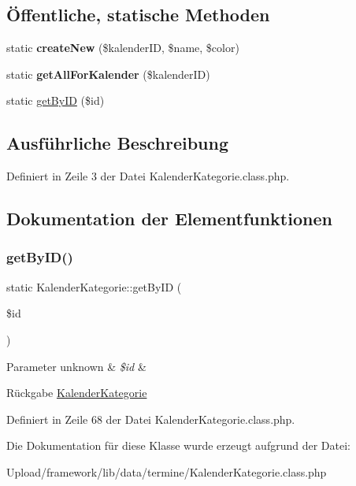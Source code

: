\subsection*{Öffentliche, statische Methoden}
\begin{DoxyCompactItemize}
\item 
\mbox{\label{class_kalender_kategorie_a96a63f62d1862924ce91e958fed52f47}} 
static {\bfseries create\+New} (\$kalender\+ID, \$name, \$color)
\item 
\mbox{\label{class_kalender_kategorie_ad98c2ff80e8d5e48bb11dc070582db7e}} 
static {\bfseries get\+All\+For\+Kalender} (\$kalender\+ID)
\item 
static \mbox{\hyperlink{class_kalender_kategorie_af3a3ceefaf4dbad3e505f9ecf54609f7}{get\+By\+ID}} (\$id)
\end{DoxyCompactItemize}


\subsection{Ausführliche Beschreibung}


Definiert in Zeile 3 der Datei Kalender\+Kategorie.\+class.\+php.



\subsection{Dokumentation der Elementfunktionen}
\mbox{\label{class_kalender_kategorie_af3a3ceefaf4dbad3e505f9ecf54609f7}} 
\subsubsection{\texorpdfstring{get\+By\+I\+D()}{getByID()}}
{\footnotesize\ttfamily static Kalender\+Kategorie\+::get\+By\+ID (\begin{DoxyParamCaption}\item[{}]{\$id }\end{DoxyParamCaption})\hspace{0.3cm}{\ttfamily [static]}}


\begin{DoxyParams}[1]{Parameter}
unknown & {\em \$id} & \\
\hline
\end{DoxyParams}
\begin{DoxyReturn}{Rückgabe}
\mbox{\hyperlink{class_kalender_kategorie}{Kalender\+Kategorie}} 
\end{DoxyReturn}


Definiert in Zeile 68 der Datei Kalender\+Kategorie.\+class.\+php.



Die Dokumentation für diese Klasse wurde erzeugt aufgrund der Datei\+:\begin{DoxyCompactItemize}
\item 
Upload/framework/lib/data/termine/Kalender\+Kategorie.\+class.\+php\end{DoxyCompactItemize}
